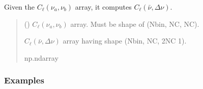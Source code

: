 \documentclass[a4paper,11pt,oneside,english,openany]{sphinxmanual}
\begin{document}
\begin{fulllineitems}
\end{fulllineitems}


\begin{fulllineitems}
\label{\detokenize{clfuncs:clfuncs.cl_dnu_nubar}}
\pysigstartsignatures
{}
\pysigstopsignatures
\sphinxAtStartPar
Given the  \(C_{\ell}(\nu_a,\nu_b)\) array, it computes \(C_{\ell}(\bar{\nu},\Delta\nu)\).
\begin{quote}\begin{description}
\sphinxAtStartPar
{} () \textendash{}  \(C_{\ell}(\nu_a,\nu_b)\) array. Must be shape of (Nbin, NC, NC).

\sphinxAtStartPar
{} \textendash{}  \(C_{\ell}(\bar{\nu},\Delta\nu)\) array having shape (Nbin, NC, 2NC \sphinxhyphen{}1).

\sphinxAtStartPar
np.ndarray

\end{description}\end{quote}
\subsubsection*{Examples}


\end{fulllineitems}
\end{document}
